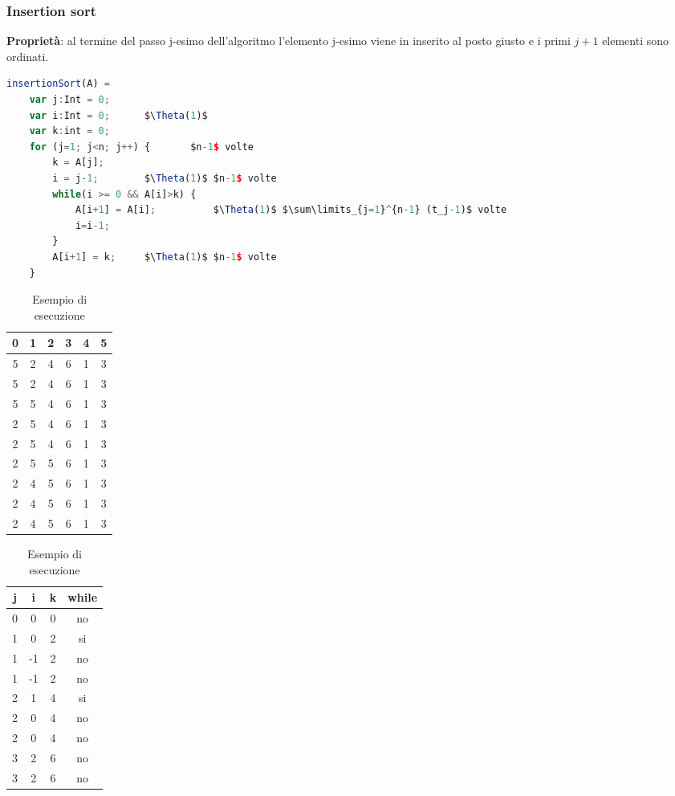 \subsubsection{Insertion sort}
\textbf{Proprietà}: al termine del passo j-esimo dell'algoritmo l'elemento j-esimo viene in inserito al posto giusto e i primi $j+1$ elementi sono ordinati.
\begin{lstlisting}[language=Javascript, caption=Algoritmo insertion sort, mathescape=true]
	insertionSort(A) =
	var j:Int = 0;
	var i:Int = 0;		$\Theta(1)$
	var k:int = 0;
	for (j=1; j<n; j++) {		$n-1$ volte
		k = A[j];
		i = j-1;		$\Theta(1)$ $n-1$ volte
		while(i >= 0 && A[i]>k) {
			A[i+1] = A[i];			$\Theta(1)$ $\sum\limits_{j=1}^{n-1} (t_j-1)$ volte
			i=i-1;
		}
		A[i+1] = k;		$\Theta(1)$ $n-1$ volte
	}
\end{lstlisting}
\begin{table}[h]
	\begin{tabular}{ |c|c|c|c|c|c| }
		\hline
		0 & 1 & 2 & 3 & 4 & 5 \\
		\hline
		5 & 2 & 4 & 6 & 1 & 3 \\
		\hline 
		5 & 2 & 4 & 6 & 1 & 3 \\
		\hline 
		5 & 5 & 4 & 6 & 1 & 3 \\
		\hline 
		2 & 5 & 4 & 6 & 1 & 3 \\
		\hline 
		2 & 5 & 4 & 6 & 1 & 3 \\
		\hline 
		2 & 5 & 5 & 6 & 1 & 3 \\
		\hline 
		2 & 4 & 5 & 6 & 1 & 3 \\
		\hline 
		2 & 4 & 5 & 6 & 1 & 3 \\
		\hline 
		2 & 4 & 5 & 6 & 1 & 3 \\
		\hline 
	\end{tabular}
	\begin{tabular} { |c|c|c|c|}
		\hline
		j & i & k & while \\
		\hline
		0 & 0 & 0 & no \\
		\hline
		1 & 0 & 2 & si \\
		\hline
		1 & -1 & 2 & no \\
		\hline
		1 & -1 & 2 & no \\
		\hline
		2 & 1 & 4 & si \\
		\hline
		2 & 0 & 4 & no \\
		\hline
		2 & 0 & 4 & no \\
		\hline
		3 & 2 & 6 & no \\
		\hline
		3 & 2 & 6 & no \\
		\hline
	\end{tabular}
	\caption{Esempio di esecuzione}
\end{table}
